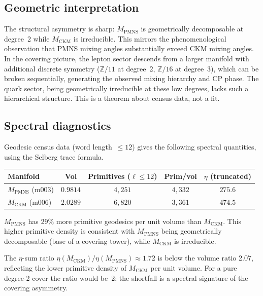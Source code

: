 ﻿\documentclass[12pt]{article}
\theoremstyle{definition}
\begin{document}
\subsection{Geometric interpretation}

The structural asymmetry is sharp: $M_\text{PMNS}$ is geometrically
decomposable at degree~2 while $M_\text{CKM}$ is irreducible.
This mirrors the phenomenological observation that PMNS mixing angles
substantially exceed CKM mixing angles.
In the covering picture, the lepton sector descends from a larger
manifold with additional discrete symmetry ($\mathbb{Z}/11$ at
degree~2, $\mathbb{Z}/16$ at degree~3), which can be broken
sequentially, generating the observed mixing hierarchy and CP phase.
The quark sector, being geometrically irreducible at these low degrees,
lacks such a hierarchical structure. This is a theorem about census
data, not a fit.

\subsection{Spectral diagnostics}
\label{subsec:spectral_covering}

Geodesic census data (word length~$\leq 12$) gives the following
spectral quantities, using the Selberg trace formula.

\begin{center}\small
\begin{tabular}{lcccc}
\toprule
Manifold & Vol & Primitives ($\ell\leq 12$) & Prim/vol & $\eta$ (truncated) \\
\midrule
$M_\text{PMNS}$ (m003) & $0.9814$ & $4{,}251$ & $4{,}332$ & $275.6$ \\
$M_\text{CKM}$  (m006) & $2.0289$ & $6{,}820$ & $3{,}361$ & $474.5$ \\
\bottomrule
\end{tabular}
\end{center}

$M_\text{PMNS}$ has 29\% more primitive geodesics per unit volume than
$M_\text{CKM}$. This higher primitive density is consistent with
$M_\text{PMNS}$ being geometrically decomposable (base of a covering
tower), while $M_\text{CKM}$ is irreducible.

The $\eta$-sum ratio $\eta(M_\text{CKM})/\eta(M_\text{PMNS})\approx 1.72$
is below the volume ratio $2.07$, reflecting the lower primitive density
of $M_\text{CKM}$ per unit volume. For a pure degree-2 cover the ratio
would be~2; the shortfall is a spectral signature of the covering
asymmetry.
\end{document}

